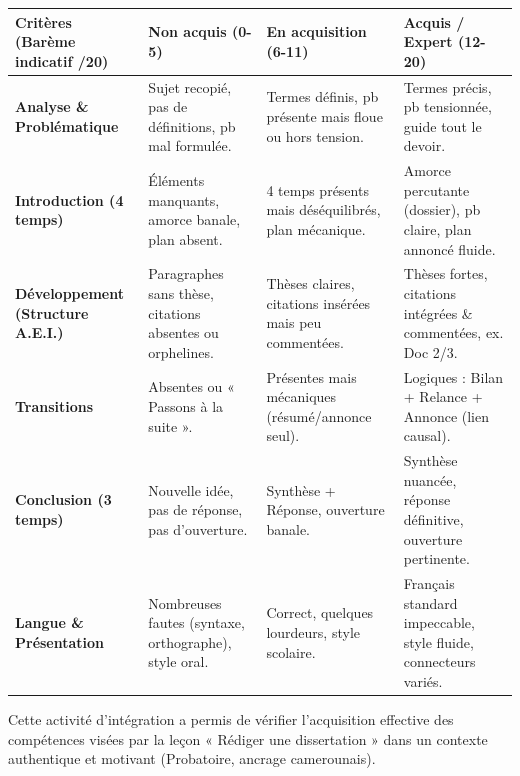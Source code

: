 \documentclass[11pt]{article}
\newcounter{popsec}
\newcounter{popsub}
\newcommand{\courssub}[1]{%
  \stepcounter{popsub}%
  \par\vspace{9pt}\noindent{\popxbold\fontsize{11.5}{13}\selectfont\color{popink}{\color{poporange}\thepopsec.\thepopsub}\hspace{6pt}#1}\par\nopagebreak\vspace{4pt}
}
\begin{document}
\begin{exoresolu}
\begin{center}
\begin{tabularx}{\linewidth}{|l|X|X|X|}\hline
\rowcolor{popblueL}
\textbf{Critères (Barème indicatif /20)} & \textbf{Non acquis (0-5)} & \textbf{En acquisition (6-11)} & \textbf{Acquis / Expert (12-20)} \\ \hline
\textbf{Analyse \& Problématique} & Sujet recopié, pas de définitions, pb mal formulée. & Termes définis, pb présente mais floue ou hors tension. & Termes précis, pb tensionnée, guide tout le devoir. \\ \hline
\textbf{Introduction (4 temps)} & Éléments manquants, amorce banale, plan absent. & 4 temps présents mais déséquilibrés, plan mécanique. & Amorce percutante (dossier), pb claire, plan annoncé fluide. \\ \hline
\textbf{Développement (Structure A.E.I.)} & Paragraphes sans thèse, citations absentes ou orphelines. & Thèses claires, citations insérées mais peu commentées. & Thèses fortes, citations intégrées \& commentées, ex. Doc 2/3. \\ \hline
\textbf{Transitions} & Absentes ou « Passons à la suite ». & Présentes mais mécaniques (résumé/annonce seul). & Logiques : Bilan + Relance + Annonce (lien causal). \\ \hline
\textbf{Conclusion (3 temps)} & Nouvelle idée, pas de réponse, pas d'ouverture. & Synthèse + Réponse, ouverture banale. & Synthèse nuancée, réponse définitive, ouverture pertinente. \\ \hline
\textbf{Langue \& Présentation} & Nombreuses fautes (syntaxe, orthographe), style oral. & Correct, quelques lourdeurs, style scolaire. & Français standard impeccable, style fluide, connecteurs variés. \\ \hline
\end{tabularx}
\end{center}

\end{exoresolu}

\courssub{Bilan de l'activité}
\noindent Cette activité d'intégration a permis de vérifier l'acquisition effective des compétences visées par la leçon « Rédiger une dissertation » dans un contexte authentique et motivant (Probatoire, ancrage camerounais).
\end{document}
